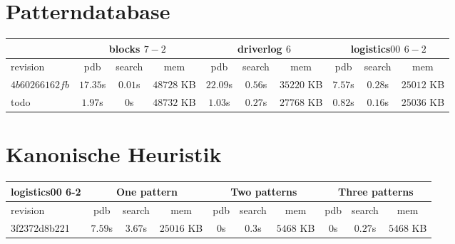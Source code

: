 \documentclass[a4paper,12pt]{scrartcl}
\begin{document}
\section{Patterndatabase}

\begin{tabular}{|l|c|c|c|c|c|c|c|c|c|}\hline
& \multicolumn{3}{c|}{blocks $7-2$} & \multicolumn{3}{c|}{driverlog $6$} & \multicolumn{3}{c|}{logistics$00$ $6-2$}\\\hline
revision & pdb & search & mem & pdb & search & mem & pdb & search & mem\\\hline
$4b60266162fb$ & $17.35$s & $0.01$s & $48728$ KB & $22.09$s & $0.56$s & $35220$ KB & $7.57$s & $0.28$s & $25012$ KB\\\hline
todo & $1.97$s & $0$s & $48732$ KB & $1.03$s & $0.27$s & $27768$ KB & $0.82$s & $0.16$s & $25036$ KB\\\hline
\end{tabular}

\section{Kanonische Heuristik}

\begin{tabular}{|l|c|c|c|c|c|c|c|c|c|}\hline
logistics00 6-2 & \multicolumn{3}{c|}{One pattern} & \multicolumn{3}{c|}{Two patterns} & \multicolumn{3}{c|}{Three patterns}\\\hline
revision & pdb & search & mem & pdb & search & mem & pdb & search & mem\\\hline
3f2372d8b221 & $7.59$s & $3.67$s & $25016$ KB & $0$s & $0.3$s & $5468$ KB & $0$s & $0.27$s & $5468$ KB\\\hline
\end{tabular}
\end{document}
